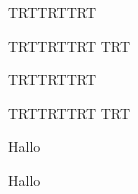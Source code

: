 \documentclass{scrbook}
\newcommand{\textsyriac}[1] %
       {\bgroup\luatextextdir TRT\syriacfont #1\egroup}
\newenvironment{syriac}     %
       {\luatextextdir TRT\luatexpardir TRT\luatexbodydir TRT%
       \syriacfont}{}
\begin{document}
\the\luatexbodydir
   \begin{syriac}
    \beginnumbering

\pstart 
        \lipsum[5]
        \lipsum[5]
    \pend
\begin{syriac}
    \pstart  %
        \textsyriac{}
\pend
\end{syriac}
    \endnumbering
    \end{syriac}

\begin{pages}
    \begin{Leftside}
    \begin{syriac}
    \beginnumbering

\pstart 
        \lipsum[5]
        \lipsum[5]
    \pend
\begin{syriac}
    \pstart  %
        \textsyriac{}
\pend
\end{syriac}
    \endnumbering
    \end{syriac}
    \end{Leftside}

    \begin{Rightside}
    \beginnumbering

\pstart
        Hallo
    \pend

\pstart
        Hallo 
    \pend

    \endnumbering
    \end{Rightside}
\end{pages} 
\Pages
\end{document}
